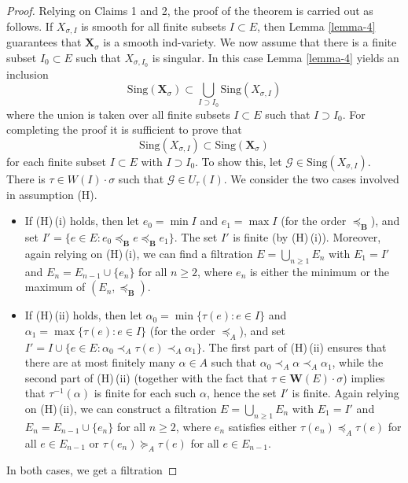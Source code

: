 \documentclass[12pt]{amsart}
\theoremstyle{definition}
\begin{document}
\begin{proof}
\medskip
Relying on Claims 1 and 2, the proof of the theorem is carried out as
follows. If
$X_{\sigma,I}$
is smooth for all finite subsets $I\subset E$, then Lemma
\ref{lemma-4} guarantees that $\mathbf{X}_\sigma$ is a smooth
ind-variety. We now assume that there is a finite subset $I_0\subset
E$ such that $X_{\sigma,I_0}$ is singular. In this case
Lemma \ref{lemma-4} yields an inclusion
\[\mathrm{Sing}(\mathbf{X}_\sigma)\subset\bigcup_{I\supset I_0}\mathrm{Sing}(X_{\sigma,I})\]
where the union is taken over all finite subsets $I\subset E$ such
that $I\supset I_0$. For completing the proof it is sufficient to
prove that
\begin{equation}
\label{relation-1-last}
\mathrm{Sing}(X_{\sigma,I})\subset\mathrm{Sing}(\mathbf{X}_\sigma)
\end{equation}
for each finite subset $I\subset E$ with $I\supset I_0$. To show
this, let $\mathcal{G}\in\mathrm{Sing}(X_{\sigma,I})$. There is
$\tau\in W(I)\cdot\sigma$ such that $\mathcal{G}\in U_{\tau}(I)$.
We consider the two cases involved in assumption {\rm (H)}.
\begin{itemize}
\item If {\rm (H)\,(i)} holds, then let $e_0=\min I$ and $e_1=\max I$ (for the order $\preceq_\mathbf{B}$), and set $I'=\{e\in E:e_0\preceq_\mathbf{B}e\preceq_\mathbf{B}e_1\}$.
The set $I'$ is finite (by {\rm (H)\,(i)}). Moreover, again relying on {\rm (H)\,(i)}, we can find a filtration $E=\bigcup_{n\geq 1}E_n$ with $E_1=I'$ and $E_n=E_{n-1}\cup\{e_n\}$ for all $n\geq 2$, where $e_n$ is either the minimum or the maximum of $(E_n,\preceq_\mathbf{B})$.
\item If {\rm (H)\,(ii)} holds, then let $\alpha_0=\min\{\tau(e):e\in I\}$ and $\alpha_1=\max\{\tau(e):e\in I\}$ (for the order $\preceq_A$), and set $I'=I\cup \{e\in E:\alpha_0\prec_A\tau(e)\prec_A\alpha_1\}$.
The first part of  {\rm (H)\,(ii)} ensures that there are at most finitely many $\alpha\in A$ such that 
$\alpha_0\prec_A\alpha\prec_A\alpha_1$, while the second part of {\rm (H)\,(ii)} (together with the fact that $\tau\in \mathbf{W}(E)\cdot\sigma$) implies that $\tau^{-1}(\alpha)$ is finite for each such $\alpha$, hence the set $I'$ is finite.
Again relying on {\rm (H)\,(ii)}, we can construct a filtration $E=\bigcup_{n\geq 1}E_n$ with $E_1=I'$ and $E_n=E_{n-1}\cup\{e_n\}$ for all $n\geq 2$, where $e_n$ satisfies either $\tau(e_n)\preceq_A\tau(e)$ for all $e\in E_{n-1}$ or $\tau(e_n)\succeq_A\tau(e)$ for all $e\in E_{n-1}$.
\end{itemize}
In both cases, we get a filtration

\end{proof}
\end{document}
